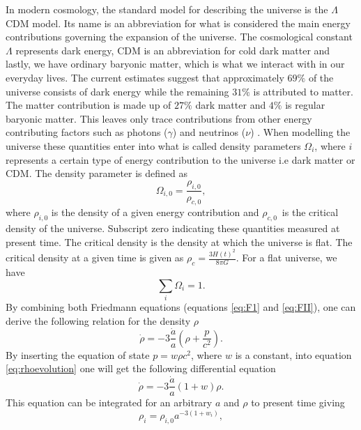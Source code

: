 In modern cosmology, the standard model for describing the universe is the $\Lambda$CDM model. Its name is an abbreviation for what 
is considered the main energy contributions governing the expansion of the universe. The cosmological constant $\Lambda$ represents dark energy, CDM is an abbreviation for cold dark matter
and lastly, we have ordinary baryonic matter, which is what we interact with in our
everyday lives. The current estimates suggest that approximately $69\%$ of the
universe consists of dark energy while the remaining $31\%$ is attributed to
matter. The matter contribution is made up of
$27\%$ dark matter and $4\%$ is regular baryonic matter. This leaves only trace contributions from other
energy contributing factors such as photons ($\gamma$) and neutrinos ($\nu$)
\cite{planckparameters}. When modelling the universe these quantities
enter into 
what is called density parameters $\Omega_i$, where $i$ represents a certain type of energy contribution to the universe i.e dark matter or CDM. The density parameter is defined as
\begin{equation}\label{eq:densityparameter}
    \Omega_{i,0} = \frac{\rho_{i,0}}{\rho_{c,0}},
\end{equation}
where $\rho_{i,0}$ is the density of a given energy contribution and $\rho_{c,0}$ is
the critical density of the universe. Subscript zero indicating these quantities
measured at present time. The critical density is the density at which the universe is flat. The critical density at a
given time is given as $\rho_c=\frac{3H(t)^2}{8\pi G}$. For a flat universe, we have
\begin{equation}
    \sum_i \Omega_i = 1.
\end{equation}
By combining both Friedmann equations (equations \ref{eq:F1} and \ref{eq:FII}),
one can derive the following relation for the density $\rho$
\begin{equation}\label{eq:rhoevolution}
    \dot{\rho}=-3\frac{\dot{a}}{a}(\rho+\frac{p}{c^2}).
\end{equation}
By inserting the equation of state $p=w\rho c^2$, where $w$ is a constant,
into equation \ref{eq:rhoevolution} one will get the following differential
equation
\begin{equation}
    \dot{\rho}=-3\frac{\dot{a}}{a}(1+w)\rho.
\end{equation}
This equation can be integrated for an arbitrary $a$ and $\rho$ to present time
giving
\begin{equation}\label{eq:rho_i_evolution}
    \rho_i=\rho_{i,0}a^{-3(1+w_i)},
\end{equation}
